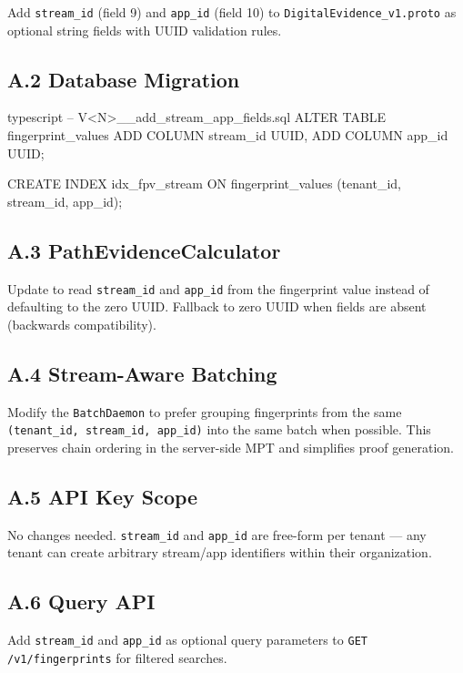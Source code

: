 \documentclass[11pt,a4paper]{article}
\begin{document}
Add \texttt{stream\_id} (field 9) and \texttt{app\_id} (field 10) to
\texttt{DigitalEvidence\_v1.proto} as optional string fields with UUID validation rules.

\subsection*{A.2 Database Migration}

\begin{codebox}{typescript}
-- V<N>__add_stream_app_fields.sql
ALTER TABLE fingerprint_values
  ADD COLUMN stream_id UUID,
  ADD COLUMN app_id UUID;

CREATE INDEX idx_fpv_stream ON fingerprint_values (tenant_id, stream_id, app_id);
\end{codebox}

\subsection*{A.3 PathEvidenceCalculator}

Update to read \texttt{stream\_id} and \texttt{app\_id} from the fingerprint value instead
of defaulting to the zero UUID. Fallback to zero UUID when fields are absent (backwards
compatibility).

\subsection*{A.4 Stream-Aware Batching}

Modify the \texttt{BatchDaemon} to prefer grouping fingerprints from the same
\texttt{(tenant\_id, stream\_id, app\_id)} into the same batch when possible. This
preserves chain ordering in the server-side MPT and simplifies proof generation.

\subsection*{A.5 API Key Scope}

No changes needed. \texttt{stream\_id} and \texttt{app\_id} are free-form per tenant ---
any tenant can create arbitrary stream/app identifiers within their organization.

\subsection*{A.6 Query API}

Add \texttt{stream\_id} and \texttt{app\_id} as optional query parameters to
\texttt{GET /v1/fingerprints} for filtered searches.
\end{document}
